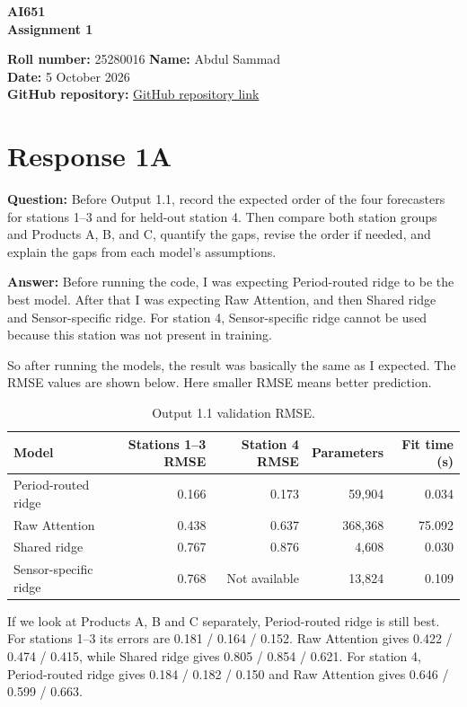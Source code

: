 \documentclass[11pt]{article}
\begin{document}
\begin{center}
    {\Large \textbf{AI651}}\\[0.3em]
    {\large \textbf{Assignment 1}}
\end{center}

\textbf{Roll number:} 25280016 \hfill \textbf{Name:} Abdul Sammad\\
\textbf{Date:} 5 October 2026\\
\textbf{GitHub repository:} \href{https://github.com/AbdulSammad1/Deep-Learning-For-Space-Time-and-Graph-Assignment-1}{GitHub repository link}

\section*{Response 1A}

\textbf{Question:} Before Output 1.1, record the expected order of the four forecasters for stations 1--3 and for held-out station 4. Then compare both station groups and Products A, B, and C, quantify the gaps, revise the order if needed, and explain the gaps from each model's assumptions.

\textbf{Answer:} Before running the code, I was expecting Period-routed ridge to be the best model. After that I was expecting Raw Attention, and then Shared ridge and Sensor-specific ridge. For station 4, Sensor-specific ridge cannot be used because this station was not present in training.

So after running the models, the result was basically the same as I expected. The RMSE values are shown below. Here smaller RMSE means better prediction.

\begin{table}[H]
\centering
\begin{tabular}{lrrrr}
\toprule
\textbf{Model} & \textbf{Stations 1--3 RMSE} & \textbf{Station 4 RMSE} & \textbf{Parameters} & \textbf{Fit time (s)} \\
\midrule
Period-routed ridge & 0.166 & 0.173 & 59,904 & 0.034 \\
Raw Attention & 0.438 & 0.637 & 368,368 & 75.092 \\
Shared ridge & 0.767 & 0.876 & 4,608 & 0.030 \\
Sensor-specific ridge & 0.768 & Not available & 13,824 & 0.109 \\
\bottomrule
\end{tabular}
\caption{Output 1.1 validation RMSE.}
\end{table}

If we look at Products A, B and C separately, Period-routed ridge is still best. For stations 1--3 its errors are 0.181 / 0.164 / 0.152. Raw Attention gives 0.422 / 0.474 / 0.415, while Shared ridge gives 0.805 / 0.854 / 0.621. For station 4, Period-routed ridge gives 0.184 / 0.182 / 0.150 and Raw Attention gives 0.646 / 0.599 / 0.663.
\end{document}
